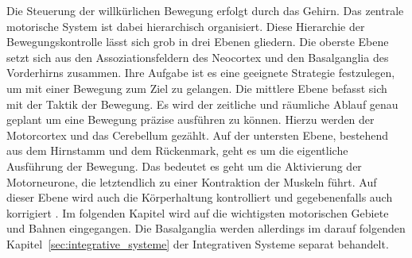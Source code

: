 Die Steuerung der willkürlichen Bewegung erfolgt durch das Gehirn. Das zentrale motorische System ist dabei hierarchisch organisiert. Diese Hierarchie der Bewegungskontrolle lässt sich grob in drei Ebenen gliedern. Die oberste Ebene setzt sich aus den Assoziationsfeldern des Neocortex und den Basalganglia des Vorderhirns zusammen. Ihre Aufgabe ist es eine geeignete Strategie festzulegen, um mit einer Bewegung zum Ziel zu gelangen. Die mittlere Ebene befasst sich mit der Taktik der Bewegung. Es wird der zeitliche und räumliche Ablauf genau geplant um eine Bewegung präzise ausführen zu können. Hierzu werden der Motorcortex und das Cerebellum gezählt. Auf der untersten Ebene, bestehend aus dem Hirnstamm und dem Rückenmark, geht es um die eigentliche Ausführung der Bewegung. Das bedeutet es geht um die Aktivierung der Motorneurone, die letztendlich zu einer Kontraktion der Muskeln führt. Auf dieser Ebene wird auch die Körperhaltung kontrolliert und gegebenenfalls auch korrigiert \textsuperscript{\cite[Kap.~14]{neurowissenschaften_baer}}. Im folgenden Kapitel wird auf die wichtigsten motorischen Gebiete und Bahnen eingegangen. Die Basalganglia werden allerdings im darauf folgenden Kapitel~\ref{sec:integrative_systeme} der Integrativen Systeme separat behandelt.   
